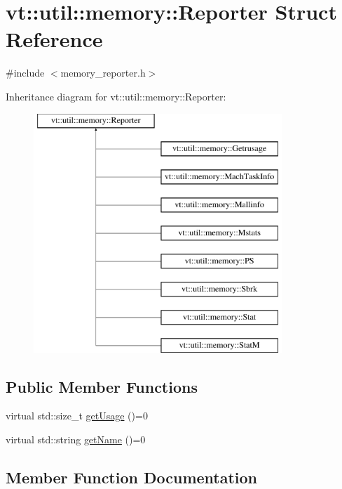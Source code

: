 \hypertarget{structvt_1_1util_1_1memory_1_1_reporter}{}\section{vt\+:\+:util\+:\+:memory\+:\+:Reporter Struct Reference}
\label{structvt_1_1util_1_1memory_1_1_reporter}


{\ttfamily \#include $<$memory\+\_\+reporter.\+h$>$}

Inheritance diagram for vt\+:\+:util\+:\+:memory\+:\+:Reporter\+:\begin{figure}[H]
\begin{center}
\leavevmode
\includegraphics[height=9.000000cm]{structvt_1_1util_1_1memory_1_1_reporter}
\end{center}
\end{figure}
\subsection*{Public Member Functions}
\begin{DoxyCompactItemize}
\item 
virtual std\+::size\+\_\+t \hyperlink{structvt_1_1util_1_1memory_1_1_reporter_a372574f51fdb68077cd3d227ee373de5}{get\+Usage} ()=0
\item 
virtual std\+::string \hyperlink{structvt_1_1util_1_1memory_1_1_reporter_a83fc36e9cff3ce2deedf1d4546694713}{get\+Name} ()=0
\end{DoxyCompactItemize}


\subsection{Member Function Documentation}
\mbox{\label{structvt_1_1util_1_1memory_1_1_reporter_a83fc36e9cff3ce2deedf1d4546694713}} 
